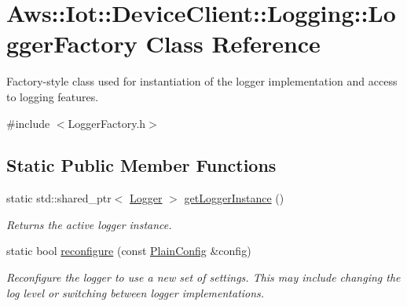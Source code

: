 \hypertarget{class_aws_1_1_iot_1_1_device_client_1_1_logging_1_1_logger_factory}{}\section{Aws\+:\+:Iot\+:\+:Device\+Client\+:\+:Logging\+:\+:Logger\+Factory Class Reference}
\label{class_aws_1_1_iot_1_1_device_client_1_1_logging_1_1_logger_factory}


Factory-\/style class used for instantiation of the logger implementation and access to logging features.  




{\ttfamily \#include $<$Logger\+Factory.\+h$>$}

\subsection*{Static Public Member Functions}
\begin{DoxyCompactItemize}
\item 
static std\+::shared\+\_\+ptr$<$ \hyperlink{class_aws_1_1_iot_1_1_device_client_1_1_logging_1_1_logger}{Logger} $>$ \hyperlink{class_aws_1_1_iot_1_1_device_client_1_1_logging_1_1_logger_factory_aa3aeb2ab09afe3977d3a4b273a1406ae}{get\+Logger\+Instance} ()
\begin{DoxyCompactList}\small\item\em Returns the active logger instance. \end{DoxyCompactList}\item 
static bool \hyperlink{class_aws_1_1_iot_1_1_device_client_1_1_logging_1_1_logger_factory_aa653d2356cf9852d3dd07a3f1017393f}{reconfigure} (const \hyperlink{struct_aws_1_1_iot_1_1_device_client_1_1_plain_config}{Plain\+Config} \&config)
\begin{DoxyCompactList}\small\item\em Reconfigure the logger to use a new set of settings. This may include changing the log level or switching between logger implementations. \end{DoxyCompactList}\end{DoxyCompactItemize}
